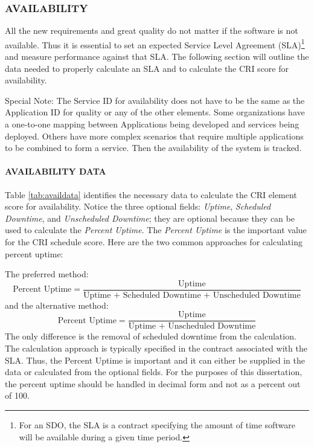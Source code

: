 \documentclass[SDSUThesis.tex]{subfiles}
\begin{document}
        \subsubsection{AVAILABILITY}
            All the new requirements and great quality do not matter if the software is not available.
            Thus it
            is essential to set an expected Service Level Agreement (SLA)\footnote{For an SDO, the SLA is a 
            contract specifying the amount of time software will be available during a
            given time period. } and measure 
            performance against that SLA.  The following section will outline the data needed to properly
            calculate an SLA and to calculate the CRI score for availability.
            
            Special Note: The Service ID for availability does not have to be the same
            as the Application ID for quality or any of the other elements.  Some 
            organizations have a one-to-one mapping between Applications being developed
            and services being deployed.  Others have more complex scenarios that require
            multiple applications to be combined to form a service.  Then the availability
            of the system is tracked.
            
            \paragraph{AVAILABILITY DATA}
                Table \ref{tab:availdata} identifies the necessary data to calculate
                the CRI element score for availability.  Notice the three optional 
                fields: \textit{Uptime}, \textit{Scheduled Downtime}, and 
                \textit{Unscheduled Downtime}; they are optional because they can be
                used to calculate the \textit{Percent Uptime}.  The \textit{Percent Uptime}
                is the important value for the CRI schedule score.  Here are the two common
                approaches for calculating percent uptime:
                
                The preferred method:
                \[
                    \text{Percent Uptime} = \frac{\text{Uptime}}{\text{Uptime + Scheduled Downtime + Unscheduled Downtime}}
                \]
                and the alternative method:
                \[
                    \text{Percent Uptime} = \frac{\text{Uptime}}{\text{Uptime + Unscheduled Downtime}}
                \]
                The only difference is the removal of scheduled downtime from 
                the calculation.  The calculation approach is typically specified in
                the contract associated with the SLA.  Thus, the Percent Uptime is important
                and it can either be supplied in the data or calculated from the 
                optional fields. For the purposes of this dissertation, the percent
                uptime should be handled in decimal form and not as a percent out of 100.
            
\end{document}
